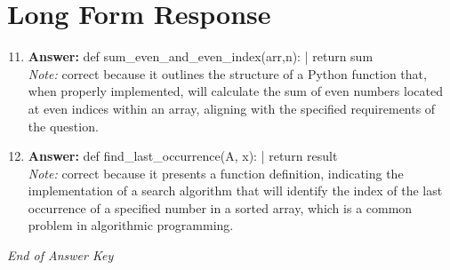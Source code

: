 \documentclass[12pt]{article}
\begin{document}
\section*{Long Form Response}
\begin{enumerate}[label=\arabic*.]
\setcounter{enumi}{10}
\item \textbf{Answer:} def sum\_even\_and\_even\_index(arr,n): | return sum
\\ \textit{Note:} correct because it outlines the structure of a Python function that, when properly implemented, will calculate the sum of even numbers located at even indices within an array, aligning with the specified requirements of the question.
\item \textbf{Answer:} def find\_last\_occurrence(A, x): | return result
\\ \textit{Note:} correct because it presents a function definition, indicating the implementation of a search algorithm that will identify the index of the last occurrence of a specified number in a sorted array, which is a common problem in algorithmic programming.
\end{enumerate}

\vfill
\noindent\textit{End of Answer Key}
\end{document}
